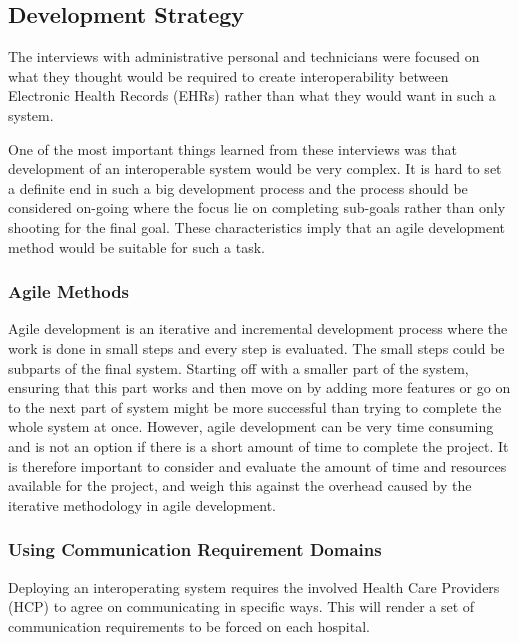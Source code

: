 \documentclass[14pt]{article}
\begin{document}
\subsection{Development Strategy}
The interviews with administrative personal and technicians were focused on what they thought would be required to create interoperability between Electronic Health Records (\glspl{EHR}) rather than what they would want in such a system. 

One of the most important things learned from these interviews was that development of an interoperable system would be very complex. It is hard to set a definite end in such a big development process and the process should be considered on-going where the focus lie on completing sub-goals rather than only shooting for the final goal. These characteristics imply that an agile development method would be suitable for such a task.

\subsubsection{Agile Methods} %
Agile development is an iterative and incremental development process where the work is done in small steps and every step is evaluated. The small steps could be subparts of the final system. Starting off with a smaller part of the system, ensuring that this part works and then move on by adding more features or go on to the next part of system might be more successful than trying to complete the whole system at once. However, agile development can be very time consuming and is not an option if there is a short amount of time to complete the project. It is therefore important to consider and evaluate the amount of time and resources available for the project, and weigh this against the overhead caused by the iterative methodology in agile development.

\subsubsection{Using Communication Requirement Domains} %
Deploying an interoperating system requires the involved Health Care Providers (HCP) to agree on communicating in specific ways. This will render a set of communication requirements to be forced on each hospital. 
\end{document}
